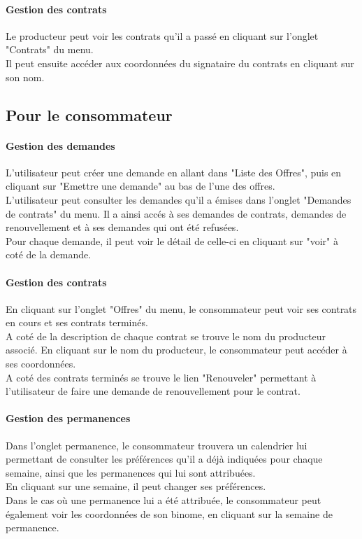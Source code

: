 \documentclass[12pt]{report}
\begin{document}
\paragraph{Gestion des contrats}
Le producteur peut voir les contrats qu'il a passé en cliquant sur l'onglet "Contrats" du menu.\\
Il peut ensuite accéder aux coordonnées du signataire du contrats en cliquant sur son nom.

\subsection{Pour le consommateur}
\paragraph{Gestion des demandes}
L'utilisateur peut créer une demande en allant dans "Liste des Offres", puis en cliquant sur "Emettre une demande" au bas de l'une des offres.\\
L'utilisateur peut consulter les demandes qu'il a émises dans l'onglet "Demandes de contrats" du menu. Il a ainsi accés à ses demandes de contrats, demandes de renouvellement et à ses demandes qui ont été refusées.\\
Pour chaque demande, il peut voir le détail de celle-ci en cliquant sur "voir" à coté de la demande.

\paragraph{Gestion des contrats}
En cliquant sur l'onglet "Offres" du menu, le consommateur peut voir ses contrats en cours et ses contrats terminés. \\
A coté de la description de chaque contrat se trouve le nom du producteur associé. En cliquant sur le nom du producteur, le consommateur peut accéder à ses coordonnées.\\

A coté des contrats terminés se trouve le lien "Renouveler" permettant à l'utilisateur de faire une demande de renouvellement pour le contrat.

\paragraph{Gestion des permanences}
Dans l'onglet permanence, le consommateur trouvera un calendrier lui permettant de consulter les préférences qu'il a déjà indiquées pour chaque semaine, ainsi que les permanences qui lui sont attribuées.\\
En cliquant sur une semaine, il peut changer ses préférences. \\
Dans le cas où une permanence lui a été attribuée, le consommateur peut également voir les coordonnées de son binome, en cliquant sur la semaine de permanence.
\end{document}
